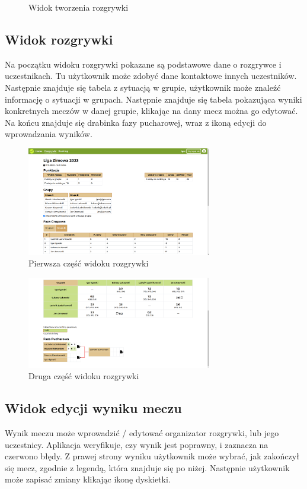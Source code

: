 \documentclass[shortabstract]{iithesis}
\begin{document}
\begin{figure}[H]
{    }
    \caption{Widok tworzenia rozgrywki}
\end{figure}

\subsection{Widok rozgrywki}
Na początku widoku rozgrywki pokazane są podstawowe dane o rozgrywce i uczestnikach.
Tu użytkownik może zdobyć dane kontaktowe innych uczestników.
Następnie znajduje się tabela z sytuacją w grupie, użytkownik może znaleźć informację o sytuacji w grupach.
Następnie znajduje się tabela pokazująca wyniki konkretnych meczów w danej grupie, klikając na dany mecz można go edytować.
Na końcu znajduje się drabinka fazy pucharowej, wraz z ikoną edycji do wprowadzania wyników.
\begin{figure}[H]
    \centering
    \includegraphics[width=0.72\textwidth,valign=t]{assets/interfejs/rozgrywka_desktop.png}
    \caption{Pierwsza część widoku rozgrywki}
\end{figure}
\begin{figure}[H]
    \centering
    \includegraphics[width=0.72\textwidth,valign=t]{assets/interfejs/rozgrywka_desktop2.png}
    \caption{Druga część widoku rozgrywki}
\end{figure}

\subsection{Widok edycji wyniku meczu}
Wynik meczu może wprowadzić / edytować organizator rozgrywki, lub jego uczestnicy.
Aplikacja weryfikuje, czy wynik jest poprawny, i zaznacza na czerwono błędy. Z prawej strony wyniku
użytkownik może wybrać, jak zakończył się mecz, zgodnie z legendą, która znajduje się po niżej.
Następnie użytkownik może zapisać zmiany klikając ikonę dyskietki.
\end{document}
